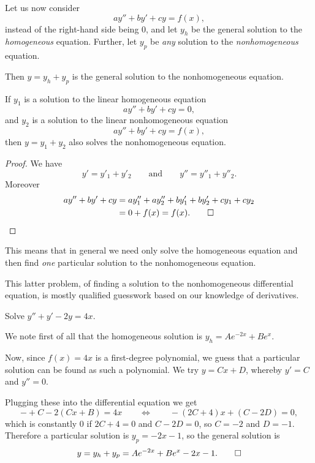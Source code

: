 

Let us now consider
\[
	a y'' + b y' + c y = f(x),
\]
instead of the right-hand side being 0, and let $y_h$ be the general solution to the \emph{homogeneous} equation.
Further, let $y_p$ be \emph{any} solution to the \emph{nonhomogeneous} equation.

Then $y = y_h + y_p$ is the general solution to the nonhomogeneous equation.

\begin{theorem}
	If $y_1$ is a solution to the linear homogeneous equation
	\[
		a y'' + b y' + c y = 0,
	\]
	and $y_2$ is a solution to the linear nonhomogeneous equation
	\[
		a y'' + b y' + c y = f(x),
	\]
	then $y = y_1 + y_2$ also solves the nonhomogeneous equation.
\end{theorem}

\begin{proof}
	We have
	\[
		y' = y'_1 + y'_2 \qquad \text{and} \qquad y'' = y''_1 + y''_2.
	\]
	Moreover
	\begin{align*}
		a y'' + b y' + c y &= a y''_1 + a y''_2 + b y'_1 + b y'_2 + c y_1 + c y_2 \\
		&= 0 + f(x) = f(x). \qedhere
	\end{align*}
\end{proof}

\noindent
This means that in general we need only solve the homogeneous equation and then find \emph{one} particular solution to the nonhomogeneous equation.

This latter problem, of finding a solution to the nonhomogeneous differential equation, is mostly qualified guesswork based on our knowledge of derivatives.

\begin{example}
	Solve $y'' + y' - 2 y = 4 x$.

	We note first of all that the homogeneous solution is $y_h = A e^{-2 x} + B e^{x}$.

	Now, since $f(x) = 4 x$ is a first-degree polynomial, we guess that a particular solution can be found as such a polynomial.
	We try $y = C x + D$, whereby $y' = C$ and $y'' = 0$.

	Plugging these into the differential equation we get
	\[
		- + C - 2(C x + B) = 4 x \qquad \Longleftrightarrow \qquad - (2 C + 4) x + (C - 2 D) = 0,
	\]
	which is constantly 0 if $2 C + 4 = 0$ and $C - 2 D = 0$, so $C = -2$ and $D = -1$.
	Therefore a particular solution is $y_p = - 2 x - 1$, so the general solution is
	\[
		y = y_h + y_p = A e^{-2 x} + B e^{x} - 2 x - 1. \qedhere
	\]
\end{example}

